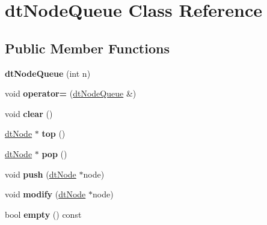 \hypertarget{classdtNodeQueue}{}\section{dt\+Node\+Queue Class Reference}
\label{classdtNodeQueue}
\subsection*{Public Member Functions}
\begin{DoxyCompactItemize}
\item 
\mbox{\label{classdtNodeQueue_a98462fc76364861576fa8547987d5458}} 
{\bfseries dt\+Node\+Queue} (int n)
\item 
\mbox{\label{classdtNodeQueue_a11d772df68288a5d6b4eecdd74141227}} 
void {\bfseries operator=} (\hyperlink{classdtNodeQueue}{dt\+Node\+Queue} \&)
\item 
\mbox{\label{classdtNodeQueue_aa0f83a0d1f38b0b97fb549d1372c8be7}} 
void {\bfseries clear} ()
\item 
\mbox{\label{classdtNodeQueue_ad76eefdf18096e14f67c579c20a506af}} 
\hyperlink{structdtNode}{dt\+Node} $\ast$ {\bfseries top} ()
\item 
\mbox{\label{classdtNodeQueue_a4fa10be8cbf65dcdf2284f18a3e949d3}} 
\hyperlink{structdtNode}{dt\+Node} $\ast$ {\bfseries pop} ()
\item 
\mbox{\label{classdtNodeQueue_a76d83f497e1a5bcf72a6cc902a696a2a}} 
void {\bfseries push} (\hyperlink{structdtNode}{dt\+Node} $\ast$node)
\item 
\mbox{\label{classdtNodeQueue_a8be783bde0911bdf92503a2e111f2a1a}} 
void {\bfseries modify} (\hyperlink{structdtNode}{dt\+Node} $\ast$node)
\item 
\mbox{\label{classdtNodeQueue_a15693f0c97c5d9a32cd0302cdcafd27c}} 
bool {\bfseries empty} () const
\item 
\mbox{\label{classdtNodeQueue_a024e0d15d235157f79bd6a386e090804}} 

\end{DoxyCompactItemize}

